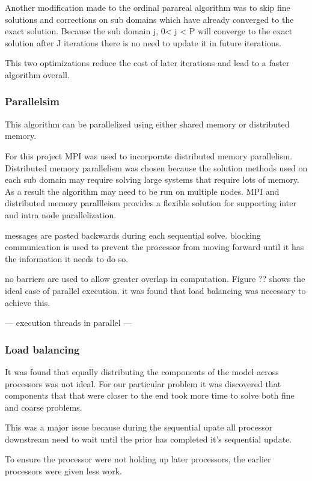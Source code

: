 \documentclass[conf]{new-aiaa}
\begin{document}
Another modification made to the ordinal parareal algorithm was to skip fine solutions and corrections on sub domains which have already converged to the exact solution.
Because the sub domain j, 0< j < P  will converge to the exact solution after J iterations there is no need to update it in future iterations.


This two optimizations reduce the cost of later iterations and lead to a faster algorithm overall.



\subsubsection{Parallelsim}
This algorithm can be parallelized using either shared memory or distributed memory.

For this project MPI was used to incorporate distributed memory parallelism.
Distributed memory parallelism was chosen because the solution methods used on each sub domain may require solving large systems that require lots of memory.
As a result the algorithm may need to be run on multiple nodes.
MPI and distributed memory parallleism provides a flexible solution for supporting inter and intra node parallelization.


messages are pasted backwards during each sequential solve.
blocking communication is used to prevent the processor from moving forward until it has the information it needs to do so.

no barriers are used to allow greater overlap in computation.
Figure ?? shows the ideal case of parallel execution. it was found that load balancing was necessary to achieve this.


--- execution threads in parallel ---




\subsubsection{Load balancing}
It was found that equally distributing the components of the model across processors was not ideal.
For our particular problem it was discovered that components that that were closer to the end took more time to solve both fine and coarse problems.

This was a major issue because during the sequential upate all processor downstream need to wait until the prior has completed it's sequential update.

To ensure the processor were not holding up later processors, the earlier processors were given less work.
\end{document}
